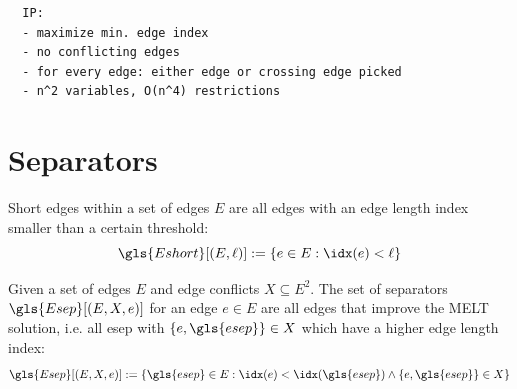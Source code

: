 \begin{verbatim}
  IP:
  - maximize min. edge index
  - no conflicting edges
  - for every edge: either edge or crossing edge picked
  - n^2 variables, O(n^4) restrictions
\end{verbatim}

\section{Separators}


\begin{definition}
  \label{def:short_edges}
  Short edges within a set of edges \(E\) are all edges with an
  edge length index smaller than a certain threshold:
  \[
    \gls{Eshort}[(E, \ell)] := \{ e \in E : \idx(e) < \ell \}
  \]
\end{definition}



\begin{definition}[Separators]
  \label{def:separators}
  Given a set of edges \(E\) and edge conflicts \(X \subseteq E^2\). 
  The set of separators \(\gls{Esep}[(E, X, e)]\) for an edge 
  \(e \in E\) are all edges
  that improve the \gls{MELT} solution, i.e. all \gls{esep} with
  \(\{e,\gls{esep}\} \in X\) which have a higher edge length index:
  \[
	  \gls{Esep}[(E,X,e)] := \{
		  \gls{esep} \in E:
		  \idx(e) < \idx(\gls{esep}) \land \{e,\gls{esep}\} \in X
	  \}
  \]
\end{definition}



